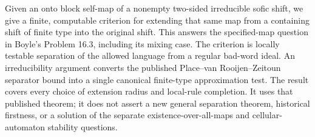 
Given an onto block self-map of a nonempty two-sided irreducible sofic
shift, we give a finite, computable criterion for extending that same
map from a containing shift of finite type into the original shift.
This answers the specified-map question in Boyle's Problem 16.3,
including its mixing case. The criterion is locally testable
separation of the allowed language from a regular bad-word ideal.
An irreducibility argument converts the published
Place--van Rooijen--Zeitoun separator bound into a single canonical
finite-type approximation test. The result covers every choice of
extension radius and local-rule completion. It uses that published
theorem; it does not assert a new general separation theorem,
historical firstness, or a solution of the separate
existence-over-all-maps and cellular-automaton stability questions.
